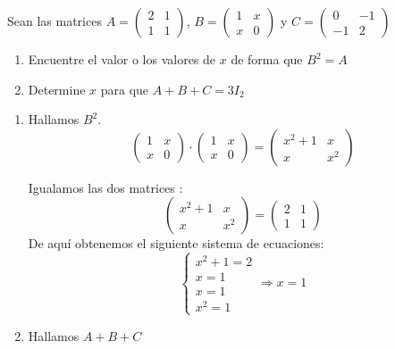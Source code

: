 \begin{ejemplo}
Sean las matrices 
$A=\begin{pmatrix}
	2 & 1 \\
	1 & 1
\end{pmatrix}$, 
$B=\begin{pmatrix}
 	1 & x \\ 
 	x & 0
\end{pmatrix}$ y  
$C=\begin{pmatrix}
	0 & -1 \\
	-1 & 2
\end{pmatrix}
$

\begin{enumerate}[label=\alph*)]
\item Encuentre el valor o los valores de $x$ de forma que $B^2=A$
\item Determine $x$ para que $A+B+C=3I_2$
\end{enumerate}

\tcblower

\begin{enumerate}[label=\alph*) ]
\item Hallamos $B^2$. 
\[ \begin{pmatrix}
	1 & x \\
	x & 0 
\end{pmatrix} \cdot 
\begin{pmatrix}
	1 & x \\
	x & 0 
\end{pmatrix}=
\begin{pmatrix}
	x^2+1 & x \\
	x & x^2
\end{pmatrix}
\]

Igualamos las dos matrices : 
\[ \begin{pmatrix}
	x^2+1 & x \\
	x & x^2
\end{pmatrix} =
\begin{pmatrix}
	2 & 1 \\
	1 & 1
\end{pmatrix} \]
De aquí obtenemos el siguiente sistema de ecuaciones:
\[
\left\lbrace
\begin{array}{l}
x^2+1=2 \\
x=1 \\
x=1 \\
x^2=1
\end{array}
\right. \Rightarrow x=1 \]

\item Hallamos $A+B+C$


\end{enumerate}
\end{ejemplo}

